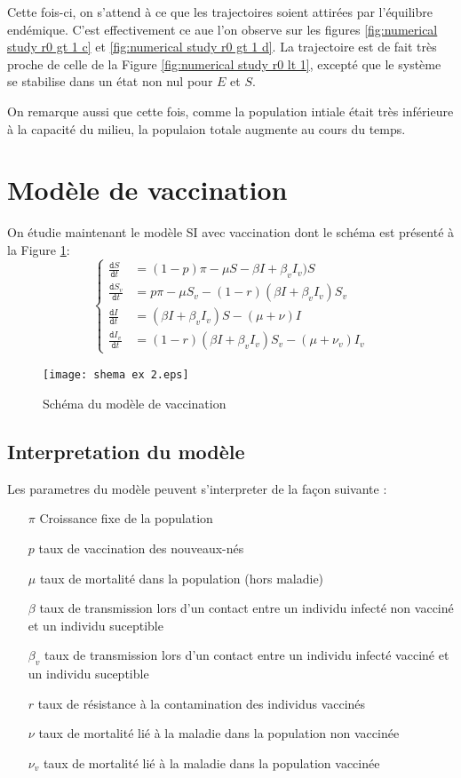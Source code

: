 \documentclass[11pt]{article}
\newcommand{\deriv}{\texttt{d}}
\newcommand{\dt}[1]{\frac{\deriv #1}{\deriv t}}
\begin{document}
Cette fois-ci, on s'attend \`a ce que les trajectoires soient attir\'ees par l'\'equilibre end\'emique. C'est effectivement ce aue l'on observe sur les figures \ref{fig:numerical study r0 gt 1 c} et \ref{fig:numerical study r0 gt 1 d}. La trajectoire est de fait tr\`es proche de celle de la Figure \ref{fig:numerical study r0 lt 1}, except\'e que le syst\`eme se stabilise dans un \'etat non nul pour $E$ et $S$.

 On remarque aussi que cette fois, comme la population intiale \'etait tr\`es inf\'erieure \`a la capacit\'e du milieu, la populaion totale augmente au cours du temps.


\section{Mod\`ele de vaccination}
On \'etudie maintenant le  mod\`ele SI avec vaccination dont le sch\'ema est pr\'esent\'e \`a la Figure \ref{fig:schema ex 2}:
\[
\left\{ \begin{aligned}
\dt S &= (1-p) \pi - \mu S -\beta I + \beta_v I_v) S\\
\dt {S_v} &= p\pi - \mu S_v- (1-r ) (\beta I + \beta_v I_v)S_v \\
\dt I &= (\beta I + \beta_v I_v)S - (\mu + \nu) I\\
\dt{ I_v} &= (1-r)(\beta I+ \beta_v I_v)S_v - (\mu + \nu_v)I_v
\end{aligned}
\right.
\]
\begin{figure}
	\centering
	\texttt{[image: shema ex 2.eps]}
	\caption{Sch\'ema du mod\`ele de vaccination}
	\label{fig:schema ex 2}
\end{figure}

\subsection{Interpretation du mod\`ele}
Les parametres du mod\`ele peuvent s'interpreter de la façon suivante :
\begin{itemize}
	\item[$\pi$] Croissance fixe de la population
	\item[$p$] taux de vaccination des nouveaux-n\'es
	\item[$\mu$] taux de mortalit\'e dans la population (hors maladie)
	\item[$\beta$] taux de transmission lors d'un contact entre un individu infect\'e non vaccin\'e et un individu suceptible
	\item[$\beta_v$] taux de transmission lors d'un contact entre un individu infect\'e vaccin\'e et un individu suceptible
	\item[$r$] taux de r\'esistance \`a la contamination des individus vaccin\'es
	\item[$\nu$] taux de mortalit\'e li\'e \`a la maladie dans la population non vaccin\'ee 
	\item[$\nu_v$] taux de mortalit\'e li\'e \`a la maladie dans la population vaccin\'ee 
\end{itemize}
\end{document}
